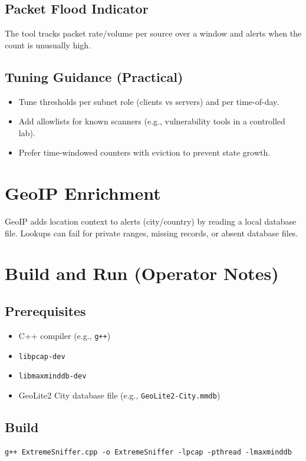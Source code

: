 \documentclass[14pt]{extarticle}
\begin{document}
\subsection{Packet Flood Indicator}
The tool tracks packet rate/volume per source over a window and alerts when the count is unusually high.

\subsection{Tuning Guidance (Practical)}
\begin{itemize}
  \item Tune thresholds per subnet role (clients vs servers) and per time-of-day.
  \item Add allowlists for known scanners (e.g., vulnerability tools in a controlled lab).
  \item Prefer time-windowed counters with eviction to prevent state growth.
\end{itemize}

\section{GeoIP Enrichment}
GeoIP adds location context to alerts (city/country) by reading a local database file. Lookups can fail for private ranges, missing records, or absent database files.

\section{Build and Run (Operator Notes)}
\subsection{Prerequisites}
\begin{itemize}
  \item C++ compiler (e.g., \texttt{g++})
  \item \texttt{libpcap-dev}\cite{libpcap}
  \item \texttt{libmaxminddb-dev}\cite{maxminddb}
  \item GeoLite2 City database file (e.g., \texttt{GeoLite2-City.mmdb})\cite{geolite2}
\end{itemize}

\subsection{Build}
\begin{lstlisting}[caption={Example build command.},label={lst:build}]
g++ ExtremeSniffer.cpp -o ExtremeSniffer -lpcap -pthread -lmaxminddb
\end{lstlisting}
\end{document}
